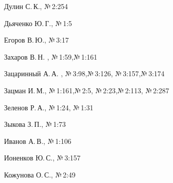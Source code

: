 \begin{theindex}
\item Дулин С.\,К., №\,2:254


\item Дьяченко Ю.\,Г., №\,1:5





  \indexspace





\item Егоров В.\,Ю., №\,3:17





  \indexspace





\item Захаров В.\,Н. , №\,1:59,\newline №\,1:161


\item Зацаринный А.\,А. , №\,3:98,\newline  №\,3:126, №\,3:157,\newline  №\,3:174


\pagebreak





\vspace*{20mm}


\item Зацман И.\,М., №\,1:161,\newline №\,2:5,  №\,2:23,\newline №\,2:113,  №\,2:287


\item Зеленов Р.\,А., №\,1:24, №\,1:31


\item Зыкова З.\,П., №\,1:73


  \indexspace





\item Иванов А.\,В., №\,1:106


\item Ионенков Ю.\,С., №\,3:157





  \indexspace





\item Кожунова О.\,С., №\,2:49



\end{theindex}
